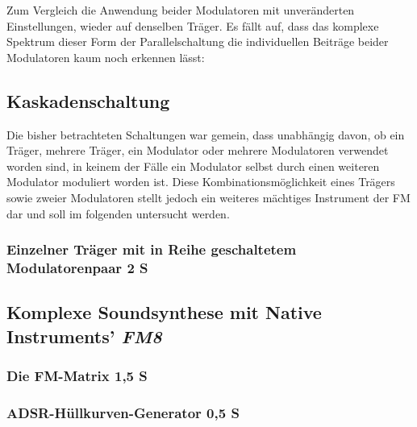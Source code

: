 Zum Vergleich die Anwendung beider Modulatoren mit unveränderten Einstellungen, wieder auf denselben Träger. Es fällt auf, dass das komplexe Spektrum dieser Form der Parallelschaltung die individuellen Beiträge beider Modulatoren kaum noch erkennen lässt:


\subsection{Kaskadenschaltung}
\label{Kaskadenschaltung}

Die bisher betrachteten Schaltungen war gemein, dass unabhängig davon, ob ein Träger, mehrere Träger, ein Modulator oder mehrere Modulatoren verwendet worden sind, in keinem der Fälle ein Modulator selbst durch einen weiteren Modulator moduliert worden ist. Diese Kombinationsmöglichkeit eines Trägers sowie zweier Modulatoren stellt jedoch ein weiteres mächtiges Instrument der FM dar und soll im folgenden untersucht werden.

\subsubsection{Einzelner Träger mit in Reihe geschaltetem Modulatorenpaar 2 S}



\subsection{Komplexe Soundsynthese mit Native Instruments' \textit{FM8}}

\subsubsection{Die FM-Matrix 1,5 S}


\subsubsection{ADSR-Hüllkurven-Generator 0,5 S}
\